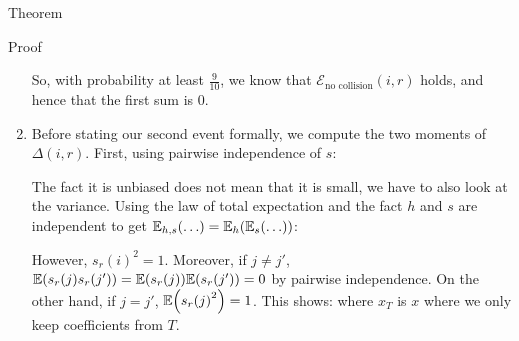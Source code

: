\documentclass[a4paper]{article}
\begin{document}
\begin{parag}{Theorem}
\begin{subparag}{Proof}
\begin{enumerate}[left=0pt]
        So, with probability at least $\frac{9}{10}$, we know that $\mathcal{E}_{\text{no collision}}\left(i, r\right)$ holds, and hence that the first sum is 0.
        \item Before stating our second event formally, we compute the two moments of $\Delta\left(i, r\right)$. First, using pairwise independence of $s$: 

        The fact it is unbiased does not mean that it is small, we have to also look at the variance. Using the law of total expectation and the fact $h$ and $s$ are independent to get $\exval_{h, s}\left(\ldots\right) = \exval_h\left(\exval_s\left(\ldots\right)\right)$: 
        
        However, $s_r\left(i\right)^2 = 1$. Moreover, if $j \neq j'$, $\exval\left(s_r\left(j\right) s_r\left(j'\right)\right) = \exval\left(s_r\left(j\right)\right) \exval\left(s_r\left(j'\right)\right) = 0$ by pairwise independence. On the other hand, if $j = j'$, $\exval\left(s_r\left(j\right)^2\right) = 1$. This shows:
        where $x_T$ is $x$ where we only keep coefficients from $T$.


\end{enumerate}
\end{subparag}
\end{parag}
\end{document}
